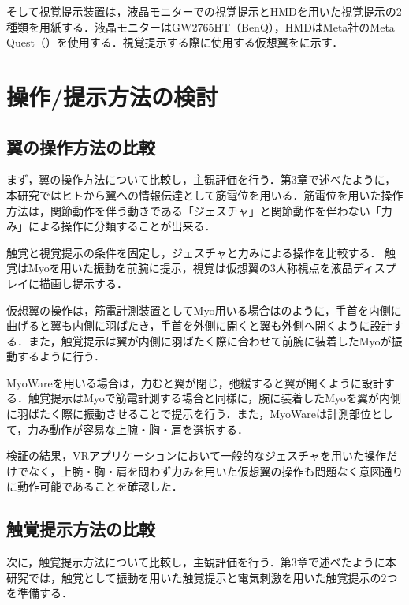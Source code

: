     そして視覚提示装置は，液晶モニターでの視覚提示とHMDを用いた視覚提示の2種類を用紙する．液晶モニターはGW2765HT（BenQ），HMDはMeta社のMeta Quest（）\cite{OculusQuest}を使用する．視覚提示する際に使用する仮想翼をに示す．

\section{操作/提示方法の検討}
    \subsection{翼の操作方法の比較}
        まず，翼の操作方法について比較し，主観評価を行う．第3章で述べたように，本研究ではヒトから翼への情報伝達として筋電位を用いる．筋電位を用いた操作方法は，関節動作を伴う動きである「ジェスチャ」と関節動作を伴わない「力み」による操作に分類することが出来る．

        触覚と視覚提示の条件を固定し，ジェスチャと力みによる操作を比較する． 触覚はMyoを用いた振動を前腕に提示，視覚は仮想翼の3人称視点を液晶ディスプレイに描画し提示する．

        仮想翼の操作は，筋電計測装置としてMyo用いる場合はのように，手首を内側に曲げると翼も内側に羽ばたき，手首を外側に開くと翼も外側へ開くように設計する．また，触覚提示は翼が内側に羽ばたく際に合わせて前腕に装着したMyoが振動するように行う．
        
        MyoWareを用いる場合は，力むと翼が閉じ，弛緩すると翼が開くように設計する．触覚提示はMyoで筋電計測する場合と同様に，腕に装着したMyoを翼が内側に羽ばたく際に振動させることで提示を行う．また，MyoWareは計測部位として，力み動作が容易な上腕・胸・肩を選択する．

        検証の結果，VRアプリケーションにおいて一般的なジェスチャを用いた操作だけでなく，上腕・胸・肩を問わず力みを用いた仮想翼の操作も問題なく意図通りに動作可能であることを確認した．

    \subsection{触覚提示方法の比較}
        次に，触覚提示方法について比較し，主観評価を行う．第3章で述べたように本研究では，触覚として振動を用いた触覚提示と電気刺激を用いた触覚提示の2つを準備する．

